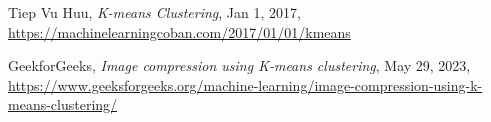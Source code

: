 \begin{thebibliography}{9}

	Tiep Vu Huu,
	\newline
	\textit{K-means Clustering}, Jan 1, 2017,
	\url{https://machinelearningcoban.com/2017/01/01/kmeans}

	GeekforGeeks,
	\textit{Image compression using K-means clustering}, May 29, 2023,
	\newline
	\url{https://www.geeksforgeeks.org/machine-learning/image-compression-using-k-means-clustering/}

\end{thebibliography}

